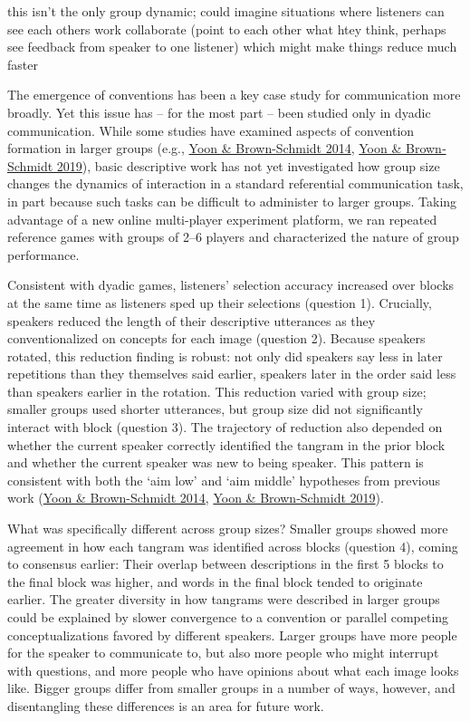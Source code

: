 \documentclass[
  english,
  a4paper,
]{article}
\begin{document}
this isn't the only group dynamic; could imagine situations where listeners can see each others work collaborate (point to each other what htey think, perhaps see feedback from speaker to one listener) which might make things reduce much faster

The emergence of conventions has been a key case study for communication more broadly. Yet this issue has -- for the most part -- been studied only in dyadic communication. While some studies have examined aspects of convention formation in larger groups (e.g., \protect\hyperlink{ref-yoonAdjustingConceptualPacts2014}{Yoon \& Brown-Schmidt 2014}, \protect\hyperlink{ref-yoonAudienceDesignMultiparty2019}{Yoon \& Brown‐Schmidt 2019}), basic descriptive work has not yet investigated how group size changes the dynamics of interaction in a standard referential communication task, in part because such tasks can be difficult to administer to larger groups. Taking advantage of a new online multi-player experiment platform, we ran repeated reference games with groups of 2--6 players and characterized the nature of group performance.

Consistent with dyadic games, listeners' selection accuracy increased over blocks at the same time as listeners sped up their selections (question 1).
Crucially, speakers reduced the length of their descriptive utterances as they conventionalized on concepts for each image (question 2). Because speakers rotated, this reduction finding is robust: not only did speakers say less in later repetitions than they themselves said earlier, speakers later in the order said less than speakers earlier in the rotation. This reduction varied with group size; smaller groups used shorter utterances, but group size did not significantly interact with block (question 3). The trajectory of reduction also depended on whether the current speaker correctly identified the tangram in the prior block and whether the current speaker was new to being speaker. This pattern is consistent with both the `aim low' and `aim middle' hypotheses from previous work (\protect\hyperlink{ref-yoonAdjustingConceptualPacts2014}{Yoon \& Brown-Schmidt 2014}, \protect\hyperlink{ref-yoonAudienceDesignMultiparty2019}{Yoon \& Brown‐Schmidt 2019}).

What was specifically different across group sizes? Smaller groups showed more agreement in how each tangram was identified across blocks (question 4), coming to consensus earlier: Their overlap between descriptions in the first 5 blocks to the final block was higher, and words in the final block tended to originate earlier. The greater diversity in how tangrams were described in larger groups could be explained by slower convergence to a convention or parallel competing conceptualizations favored by different speakers. Larger groups have more people for the speaker to communicate to, but also more people who might interrupt with questions, and more people who have opinions about what each image looks like. Bigger groups differ from smaller groups in a number of ways, however, and disentangling these differences is an area for future work.
\end{document}
